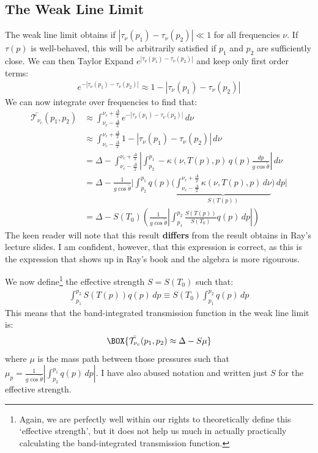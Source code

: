 \subsection{The Weak Line Limit}

The weak line limit obtains if $|\tau_\nu(p_1)-\tau_\nu(p_2)|\ll 1$ for all frequencies $\nu$. If $\tau(p)$ is well-behaved, this will be arbitrarily satisfied if $p_1$ and $p_2$ are sufficiently close. We can then Taylor Expand $e^{|\tau_\nu(p_1)-\tau_\nu(p_2)|}$ and keep only first order terms:
\begin{align*}
    e^{-|\tau_\nu(p_1)-\tau_\nu(p_2)|}\approx1-|\tau_\nu(p_1)-\tau_\nu(p_2)|
\end{align*}
We can now integrate over frequencies to find that:
\begin{align*}
    \bar{\mathcal{T}_{\nu_c}}(p_1,p_2)&\approx\int_{\nu_c-\frac{\Delta}{2}}^{\nu_c+\frac{\Delta}{2}} e^{-|\tau_\nu(p_1)-\tau_\nu(p_2)|}\,d\nu\\
    &\approx\int_{\nu_c-\frac{\Delta}{2}}^{\nu_c+\frac{\Delta}{2}} 1-|\tau_\nu(p_1)-\tau_\nu(p_2)|\,d\nu\\
    &=\Delta-\int_{\nu_c-\frac{\Delta}{2}}^{\nu_c+\frac{\Delta}{2}}
    \left|
        \int_{p_2}^{p_1}-\kappa(\nu,T(p),p)\,q(p)\frac{dp}{g\cos\tilde{\theta}}
    \right|
    \,d\nu
    \\
    &=\Delta-
    \frac{1}{g\cos\tilde{\theta}}
    \biggl|
        \int_{p_2}^{p_1}q(p)
        \biggl(\underbrace{ 
            \int_{\nu_c-\frac{\Delta}{2}}^{\nu_c+\frac{\Delta}{2}}\kappa(\nu,T(p),p)
            \,d\nu
            }_{S(T(p))}
        \biggr)
        \,dp
    \biggr|
    \\
    &=\Delta-S(T_0)\left( \frac{1}{g\cos\tilde{\theta}}\left|\int_{p_1}^{p_2}\frac{S(T(p))}{S(T_0)}q(p)\,dp\right| \right)
\end{align*}
The keen reader will note that this result \textbf{differs} from the result obtains in Ray's lecture slides. I am confident, however, that this expression is correct, as this is the expression that shows up in Ray's book \cite{Ray} and the algebra is more rigourous.

We now define\footnote{
    Again, we are perfectly well within our rights to theoretically define this `effective strength', but it does not help us much in actually practically calculating the band-integrated transmission function.
} the effective strength $S=S(T_0)$ such that:
\begin{align}
    \int_{p_1}^{p_2}S(T(p))q(p)\,dp\equiv
    S(T_0)\int_{p_1}^{p_2}q(p)\,dp
\end{align}
This means that the band-integrated transmission function in the weak line limit is:
\begin{align}
    \BOX{
        \bar{\mathcal{T}_{\nu_c}}(p_1,p_2)\approx\Delta-S\mu
    }
\end{align}
where $\mu$ is the mass path between those pressures such that $\mu_p=\frac{1}{g\cos\tilde{\theta}}\left|\int_{p_2}^{p_1} q(p)\,dp\right|$. I have also abused notation and written just $S$ for the effective strength.

